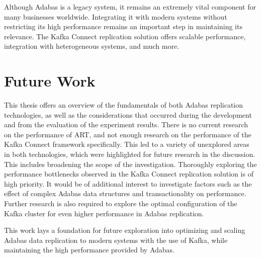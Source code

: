 Although Adabas is a legacy system, it remains an extremely vital component for many businesses worldwide. Integrating it with modern systems without restricting its high performance remains an important step in maintaining its relevance. The Kafka Connect replication solution offers scalable performance, integration with heterogeneous systems, and much more.

\section{Future Work}
This thesis offers an overview of the fundamentals of both Adabas replication technologies, as well as the considerations that occurred during the development and from the evaluation of the experiment results. There is no current research on the performance of \ac{ART}, and not enough research on the performance of the Kafka Connect framework specifically. This led to a variety of unexplored areas in both technologies, which were highlighted for future research in the discussion. This includes broadening the scope of the investigation. Thoroughly exploring the performance bottlenecks observed in the Kafka Connect replication solution is of high priority. It would be of additional interest to investigate factors such as the effect of complex Adabas data structures and transactionality on performance. Further research is also required to explore the optimal configuration of the Kafka cluster for even higher performance in Adabas replication.

This work lays a foundation for future exploration into optimizing and scaling Adabas data replication to modern systems with the use of Kafka, while maintaining the high performance provided by Adabas.